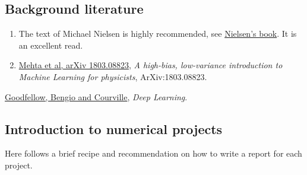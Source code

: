 \documentclass[%
oneside,                 %
final,                   %
10pt]{article}
\begin{document}
\subsection*{Background literature}

\begin{enumerate}
\item The text of Michael Nielsen is highly recommended, see \href{{http://neuralnetworksanddeeplearning.com/}}{Nielsen's book}. It is an excellent read.

\item \href{{https://arxiv.org/abs/1803.08823}}{Mehta et al, arXiv 1803.08823}, \emph{A high-bias, low-variance introduction to Machine Learning for physicists}, ArXiv:1803.08823.

\end{enumerate}

\noindent
\item \href{{https://www.deeplearningbook.org/}}{Goodfellow, Bengio and Courville}, \emph{Deep Learning}.

\subsection*{Introduction to numerical projects}

Here follows a brief recipe and recommendation on how to write a report for each
project.
\end{document}
